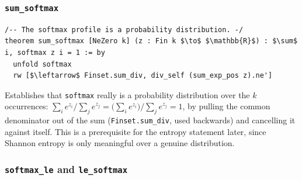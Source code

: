 \documentclass[11pt]{article}
\begin{document}
\subsubsection*{\texttt{sum\_softmax}}

\begin{lstlisting}
/-- The softmax profile is a probability distribution. -/
theorem sum_softmax [NeZero k] (z : Fin k $\to$ $\mathbb{R}$) : $\sum$ i, softmax z i = 1 := by
  unfold softmax
  rw [$\leftarrow$ Finset.sum_div, div_self (sum_exp_pos z).ne']
\end{lstlisting}

Establishes that \texttt{softmax} really is a probability distribution over
the $k$ occurrences: $\sum_i e^{z_i}/\sum_j e^{z_j} = \big(\sum_i
e^{z_i}\big)/\sum_j e^{z_j} = 1$, by pulling the common denominator out of the
sum (\texttt{Finset.sum\_div}, used backwards) and cancelling it against
itself. This is a prerequisite for the entropy statement later, since Shannon
entropy is only meaningful over a genuine distribution.

\subsubsection*{\texttt{softmax\_le} and \texttt{le\_softmax}}
\end{document}
